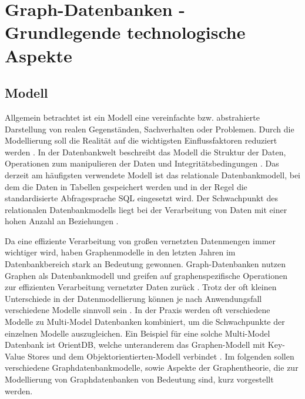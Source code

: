 \chapter{Graph-Datenbanken - Grundlegende technologische Aspekte}
\section{Modell}
Allgemein betrachtet ist ein Modell eine vereinfachte bzw. abstrahierte Darstellung von realen Gegenständen, Sachverhalten oder Problemen.
Durch die Modellierung soll die Realität auf die wichtigsten Einflussfaktoren reduziert werden \cite{datamodels}.
In der Datenbankwelt beschreibt das Modell die Struktur der Daten, Operationen zum manipulieren der Daten und Integritätsbedingungen \cite{efcodd}.
Das derzeit am häufigsten verwendete Modell ist das relationale Datenbankmodell, bei dem die Daten in Tabellen gespeichert werden und in der Regel die standardisierte Abfragesprache \ac{SQL} eingesetzt wird.
Der Schwachpunkt des relationalen Datenbankmodells liegt bei der Verarbeitung von Daten mit einer hohen Anzahl an Beziehungen \cite{vicknair2010comparison}.

Da eine effiziente Verarbeitung von großen vernetzten Datenmengen immer wichtiger wird, haben Graphenmodelle in den letzten Jahren im Datenbankbereich stark an Bedeutung gewonnen.
Graph-Datenbanken nutzen Graphen als Datenbankmodell und greifen auf graphenspezifische Operationen zur effizienten Verarbeitung vernetzter Daten zurück \cite{angles2008survey}.
Trotz der oft kleinen Unterschiede in der Datenmodellierung können je nach Anwendungsfall verschiedene Modelle sinnvoll sein \cite{angles2012comparison}.
In der Praxis werden oft verschiedene Modelle zu Multi-Model Datenbanken kombiniert, um die Schwachpunkte der einzelnen Modelle auszugleichen.
Ein Beispiel für eine solche Multi-Model Datenbank ist OrientDB, welche unteranderem das Graphen-Modell mit Key-Value Stores und dem Objektorientierten-Modell verbindet \cite{orient}.
Im folgenden sollen verschiedene Graphdatenbankmodelle, sowie Aspekte der Graphentheorie, die zur Modellierung von Graphdatenbanken von Bedeutung sind, kurz vorgestellt werden.
\newpage
